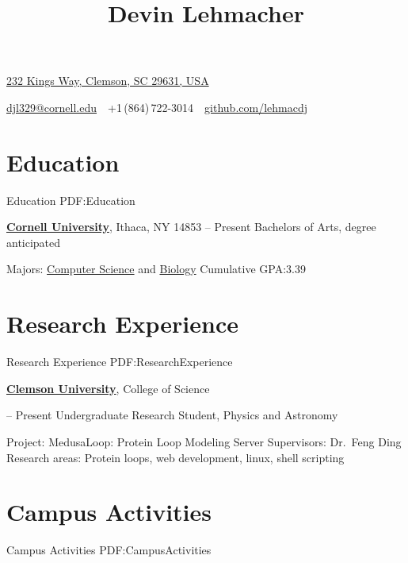 \documentclass[letterpaper,10pt,oneside]{simpleresumecv}
\newcommand{\CVAuthor}{Devin Lehmacher}
\newcommand{\CVWebpage}{github.com/lehmacdj}
\begin{document}

\title{\CVAuthor}

\begin{subtitle}
\href{https://www.google.com/maps/place/232+Kings+Way,+Clemson,+SC+29631,+USA}
{232 Kings Way, Clemson, SC 29631, USA}
\par
\href{mailto:djl329@cornell.edu}
{djl329@cornell.edu}
\,\SubBulletSymbol\,
+1\,(864)\,722-3014
\,\SubBulletSymbol\,
\href{https://\CVWebpage}
{\CVWebpage}
\end{subtitle}

\begin{body}


\section%
{Education}
{Education}
{PDF:Education}

\href{https://www.cornell.edu}
{\textbf{Cornell University}},
Ithaca, NY 14853
\hfill
{} --
Present
\GapNoBreak%
\BulletItem%
Bachelors of Arts, degree anticipated
\begin{detail}
\SubBulletItem%
Majors:
\href{https://www.cs.cornell.edu}
{Computer Science}
and
\href{https://www.biology.cornell.edu}
{Biology}
\SubBulletItem%
Cumulative GPA:\@ 3.39
\end{detail}


\section%
{Research Experience}
{Research Experience}
{PDF:ResearchExperience}

\href{https://www.clemson.edu}
{\textbf{Clemson University}},
College of Science

\GapNoBreak%
\hfill
{} --
Present
\BulletItem%
Undergraduate Research Student, Physics and Astronomy
\begin{detail}
\SubBulletItem%
Project:
MedusaLoop: Protein Loop Modeling Server
\SubBulletItem%
Supervisors:
Dr.\ Feng Ding
\SubBulletItem%
Research areas:
Protein loops, web development, linux, shell scripting
\end{detail}

\section%
{Campus Activities}
{Campus Activities}
{PDF:CampusActivities}


\end{body}
\end{document}
